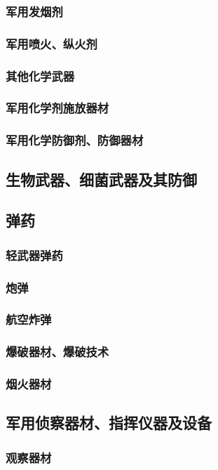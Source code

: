 \documentclass[UTF8]{../ApplicationUniverse}
\begin{document}
        \subsubsection{军用发烟剂}
        \subsubsection{军用喷火、纵火剂}
        \subsubsection{其他化学武器}
        \subsubsection{军用化学剂施放器材}
        \subsubsection{军用化学防御剂、防御器材}
    \subsection{生物武器、细菌武器及其防御}
    \subsection{弹药}
        \subsubsection{轻武器弹药}
        \subsubsection{炮弹}
        \subsubsection{航空炸弹}
        \subsubsection{爆破器材、爆破技术}
        \subsubsection{烟火器材}
    \subsection{军用侦察器材、指挥仪器及设备}
        \subsubsection{观察器材}
\end{document}
